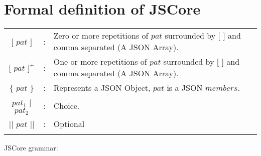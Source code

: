 
\section{Formal definition of JSCore}
\label{jscoregrammar}

\begin{scriptsize}
\leavevmode
\begin{longtable}{ c c l }


$[$ $pat$ $]$ 		& : 	& Zero or more repetitions of $pat$ surrounded by $[$ $]$ and comma separated (A JSON Array). 	\\
$[$ $pat$ $]^{+}$ 	& : 	& One or more repetitions of $pat$ surrounded by $[$ $]$ and comma separated (A JSON Array). 	\\ 
$\{$ $pat$ $\}$		& :	& Represents a JSON Object, $pat$ is a JSON $members$.						\\
$pat_{1}$ $|$ $pat_{2}$	& :	& Choice.											\\
$||$ $pat$ $||$ 	& :	& Optional											\\
\\[0.01in]

\end{longtable}
\end{scriptsize}

JSCore grammar:

